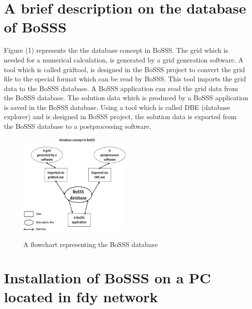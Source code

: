 \documentclass[11pt,twoside,a4paper]{fdyartcl}
\begin{document}
\section{A brief description on the database of BoSSS}
Figure (1) represents the the database concept in BoSSS. The grid which is needed for a numerical calculation, is generated by a grid generation software. A tool which is called gridtool, is designed in the BoSSS project to convert the grid file to the special format which can be read by BoSSS. This tool imports the grid data to the BoSSS database. A BoSSS application can read the grid data from the BoSSS database. The solution data which is produced by a BoSSS application is saved in the BoSSS database. Using a tool which is called DBE (database explorer) and is designed in BoSSS project, the solution data is exported from the BoSSS database to a postprocessing software.
\begin{figure}[h] %
  \begin{centering}
  \includegraphics[width=0.5\textwidth]{Figures/DB}\\
  \end{centering}
  \caption{A flowchart representing the BoSSS database}
\end{figure}
\section{Installation of BoSSS on a PC located in fdy network}
\end{document}
